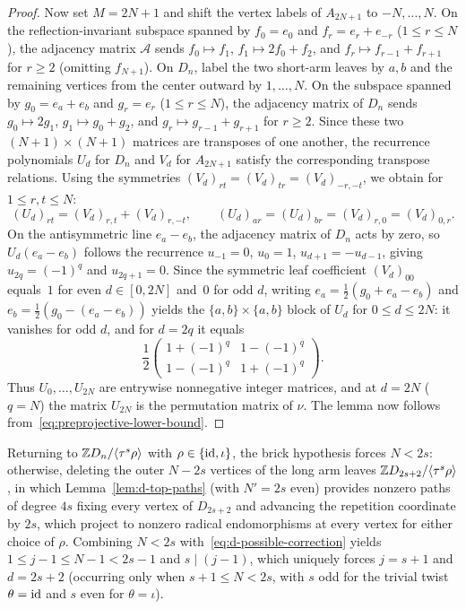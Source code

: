 \begin{proof}
Now set $M=2N+1$ and shift the vertex labels of $A_{2N+1}$ to $-N,\ldots,N$. On the reflection-invariant subspace spanned by $f_0=e_0$ and $f_r=e_r+e_{-r}$ ($1\leq r\leq N$), the adjacency matrix $\mathcal A$ sends $f_0\mapsto f_1$, $f_1\mapsto 2f_0+f_2$, and $f_r\mapsto f_{r-1}+f_{r+1}$ for $r\geq2$ (omitting $f_{N+1}$). On $D_n$, label the two short-arm leaves by $a,b$ and the remaining vertices from the center outward by $1,\ldots,N$. On the subspace spanned by $g_0=e_a+e_b$ and $g_r=e_r$ ($1\leq r\leq N$), the adjacency matrix of $D_n$ sends $g_0\mapsto 2g_1$, $g_1\mapsto g_0+g_2$, and $g_r\mapsto g_{r-1}+g_{r+1}$ for $r\geq2$. Since these two $(N+1)\times(N+1)$ matrices are transposes of one another, the recurrence polynomials $U_d$ for $D_n$ and $V_d$ for $A_{2N+1}$ satisfy the corresponding transpose relations. Using the symmetries $(V_d)_{rt}=(V_d)_{tr}=(V_d)_{-r,-t}$, we obtain for $1\leq r,t\leq N$:
\[
  (U_d)_{rt}=(V_d)_{r,t}+(V_d)_{r,-t},\qquad
  (U_d)_{ar}=(U_d)_{br}=(V_d)_{r,0}=(V_d)_{0,r}.
\]
On the antisymmetric line $e_a-e_b$, the adjacency matrix of $D_n$ acts by zero, so $U_d(e_a-e_b)$ follows the recurrence $u_{-1}=0$, $u_0=1$, $u_{d+1}=-u_{d-1}$, giving $u_{2q}=(-1)^q$ and $u_{2q+1}=0$. Since the symmetric leaf coefficient $(V_d)_{00}$ equals~$1$ for even $d\in[0,2N]$ and~$0$ for odd $d$, writing $e_a=\frac12(g_0+e_a-e_b)$ and $e_b=\frac12(g_0-(e_a-e_b))$ yields the $\{a,b\}\times\{a,b\}$ block of $U_d$ for $0\leq d\leq2N$: it vanishes for odd $d$, and for $d=2q$ it equals
\[
  \frac12\begin{pmatrix}1+(-1)^q&1-(-1)^q\\1-(-1)^q&1+(-1)^q\end{pmatrix}.
\]
Thus $U_0,\ldots,U_{2N}$ are entrywise nonnegative integer matrices, and at $d=2N$ ($q=N$) the matrix $U_{2N}$ is the permutation matrix of $\nu$. The lemma now follows from~\eqref{eq:preprojective-lower-bound}.
\end{proof}

Returning to $\mathbb Z D_n/\langle\tau^s\rho\rangle$ with $\rho\in\{\operatorname{id},\iota\}$, the brick hypothesis forces $N<2s$: otherwise, deleting the outer $N-2s$ vertices of the long arm leaves $\mathbb Z D_{2s+2}/\langle\tau^s\rho\rangle$, in which Lemma~\ref{lem:d-top-paths} (with $N'=2s$ even) provides nonzero paths of degree $4s$ fixing every vertex of $D_{2s+2}$ and advancing the repetition coordinate by $2s$, which project to nonzero radical endomorphisms at every vertex for either choice of $\rho$. Combining $N<2s$ with~\eqref{eq:d-possible-correction} yields $1\leq j-1\leq N-1<2s-1$ and $s\mid(j-1)$, which uniquely forces $j=s+1$ and $d=2s+2$ (occurring only when $s+1\leq N<2s$, with $s$ odd for the trivial twist $\theta=\operatorname{id}$ and $s$ even for $\theta=\iota$).

